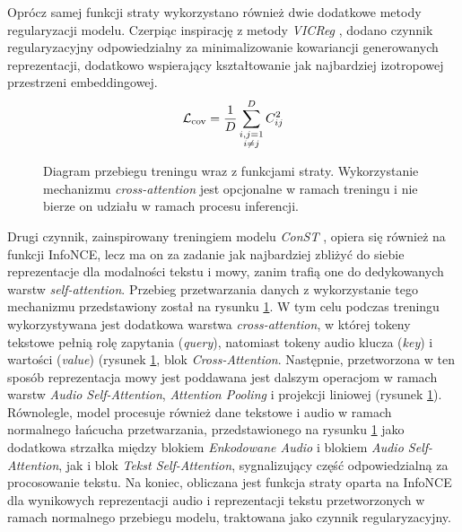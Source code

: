 Oprócz samej funkcji straty wykorzystano również dwie dodatkowe metody regularyzacji modelu. Czerpiąc inspirację z metody \textit{VICReg} \cite{bardes2022vicreg}, dodano czynnik regularyzacyjny odpowiedzialny za minimalizowanie kowariancji generowanych reprezentacji, dodatkowo wspierający kształtowanie jak najbardziej izotropowej przestrzeni embeddingowej.
\begin{equation}
    \mathcal{L}_{\mathrm{cov}} = \frac{1}{D} \sum_{\substack{i,j=1 \\ i\neq j}}^{D} C_{ij}^{2} \\
\end{equation}

\begin{figure}[!h]
    \centering
    \caption{Diagram przebiegu treningu wraz z funkcjami straty. Wykorzystanie mechanizmu \textit{cross-attention} jest opcjonalne w ramach treningu i nie bierze on udziału w ramach procesu inferencji.}
    \label{fig:eamLoss}
\end{figure}

Drugi czynnik, zainspirowany treningiem modelu \textit{ConST} \cite{ye2022const}, opiera się również na funkcji InfoNCE, lecz ma on za zadanie jak najbardziej zbliżyć do siebie reprezentacje dla modalności tekstu i mowy, zanim trafią one do dedykowanych warstw \textit{self-attention}. Przebieg przetwarzania danych z wykorzystanie tego mechanizmu przedstawiony został na rysunku \ref{fig:eamLoss}. W tym celu podczas treningu wykorzystywana jest dodatkowa warstwa \textit{cross-attention}, w której tokeny tekstowe pełnią rolę zapytania (\textit{query}), natomiast tokeny audio klucza (\textit{key}) i wartości (\textit{value}) (rysunek \ref{fig:eamLoss}, blok \textit{Cross-Attention}. Następnie, przetworzona w ten sposób reprezentacja mowy jest poddawana jest dalszym operacjom w ramach warstw \textit{Audio Self-Attention}, \textit{Attention Pooling} i projekcji liniowej (rysunek \ref{fig:eamLoss}). Równolegle, model procesuje również dane tekstowe i audio w ramach normalnego łańcucha przetwarzania, przedstawionego na rysunku \ref{fig:eamLoss} jako dodatkowa strzałka między blokiem \textit{Enkodowane Audio} i blokiem \textit{Audio Self-Attention}, jak i blok \textit{Tekst Self-Attention}, sygnalizujący część odpowiedzialną za procosowanie tekstu.  Na koniec, obliczana jest funkcja straty oparta na InfoNCE dla wynikowych reprezentacji audio i reprezentacji tekstu przetworzonych w ramach normalnego przebiegu modelu, traktowana jako czynnik regularyzacyjny.

